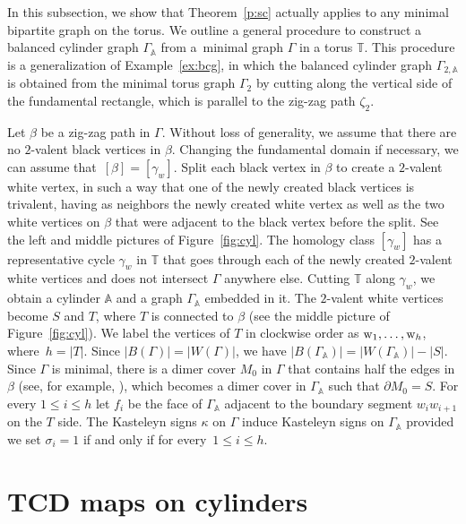 \documentclass[pdftex]{sigma}
\numberwithin{equation}{section}
\newcommand{\T}{{\mathbb T}}
\newcommand{\A}{{\mathbb A}}
\newcommand{\w}{{\rm w}}
\begin{document}
In this subsection, we show that Theorem~\ref{p:sc} actually applies to any minimal bipartite graph on the torus. We outline a general procedure to construct a balanced cylinder graph $\Gamma_\A$ from a~minimal graph $\Gamma$ in a torus $\T$. This procedure is a generalization of Example~\ref{ex:bcg}, in which the balanced cylinder graph $\Gamma_{2,\A}$ is obtained from the minimal torus graph $\Gamma_2$ by cutting along the vertical side of the fundamental rectangle, which is parallel to the zig-zag path $\zeta_2$.
	
	Let $\beta$ be a zig-zag path in $\Gamma$. Without loss of generality, we assume that there are no $2$-valent black vertices in $\beta$. Changing the fundamental domain if necessary, we can assume that~${[\beta]=[\gamma_w]}$. Split each black vertex in $\beta$ to create a $2$-valent white vertex, in such a way that one of the newly created black vertices is trivalent, having as neighbors the newly created white vertex as well as the two white vertices on $\beta$ that were adjacent to the black vertex before the split. See the left and middle pictures of Figure~\ref{fig:cyl}. The homology class $[\gamma_w]$ has a representative cycle $\gamma_w$ in $\T$ that goes through each of the newly created $2$-valent white vertices and does not intersect $\Gamma$ anywhere else. Cutting $\T$ along $\gamma_w$, we obtain a cylinder $\A$ and a graph $\Gamma_\A$ embedded in it. The $2$-valent white vertices become $S$ and $T$, where $T$ is connected to $\beta$ (see the middle picture of Figure~\ref{fig:cyl}). We label the vertices of $T$ in clockwise order as $\w_1,\dots,\w_h$, where~${h=|T|}$. Since $|B(\Gamma)|=|W(\Gamma)|$, we have $|B(\Gamma_\A)|=|W(\Gamma_\A)|-|S|$. Since $\Gamma$ is minimal, there is a dimer cover $M_0$ in $\Gamma$ that contains half the edges in $\beta$ (see, for example, \cite[Theorem~3.12]{GK13}), which becomes a dimer cover in $\Gamma_\A$ such that $\partial M_0=S$. For every $1\leq i\leq h$ let $f_i$ be the face of $\Gamma_\A$ adjacent to the boundary segment $w_i w_{i+1}$ on the $T$ side. The Kasteleyn signs $\kappa$ on $\Gamma$ induce Kasteleyn signs on $\Gamma_\A$ provided we set $\sigma_i=1$ if and only if  for every~${1\leq i\leq h}$.
	
\section{TCD maps on cylinders}
	\label{sec:tcdtorus}
	
\end{document}
